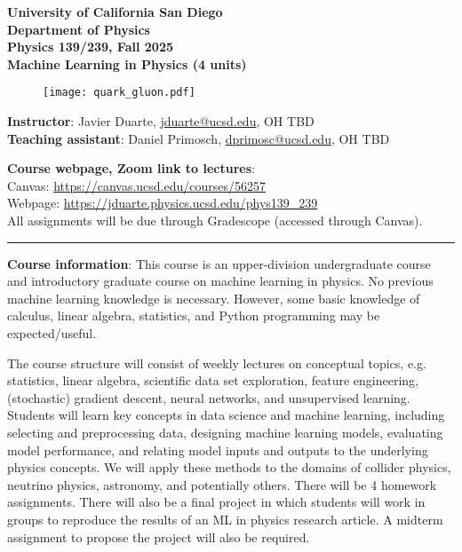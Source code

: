 \documentclass[12pt]{article}
\begin{document}
\begin{center}
	\textbf{University of California San Diego\\
		Department of Physics\\
		Physics 139/239, Fall 2025\\
		Machine Learning in Physics (4 units)}
\end{center}

\begin{figure}[h!]
	\centering
	\texttt{[image: quark\_gluon.pdf]}
\end{figure}

\noindent\textbf{Instructor}: Javier Duarte, \href{mailto:jduarte@ucsd.edu}{jduarte@ucsd.edu}, OH TBD\\
\noindent \textbf{Teaching assistant}: Daniel Primosch, \href{mailto:dprimosc@ucsd.edu}{dprimosc@ucsd.edu}, OH TBD

\noindent\textbf{Course webpage, Zoom link to lectures}:\\
\hspace*{1cm}Canvas: \href{https://canvas.ucsd.edu/courses/56257}{https://canvas.ucsd.edu/courses/56257}\\
\hspace*{1cm}Webpage: \href{https://jduarte.physics.ucsd.edu/phys139\_239}{https://jduarte.physics.ucsd.edu/phys139\_239}\\
\hspace*{1cm}All assignments will be due through Gradescope (accessed through Canvas).

\begin{center}
	\rule{\textwidth}{0.5pt}
\end{center}

\noindent\textbf{Course information}: This course is an upper-division undergraduate course and introductory graduate course on machine learning in physics.
No previous machine learning knowledge is necessary.
However, some basic knowledge of calculus, linear algebra, statistics, and Python programming may be expected/useful.

The course structure will consist of weekly lectures on conceptual topics, e.g. statistics, linear algebra, scientific data set exploration, feature engineering, (stochastic) gradient descent, neural networks, and unsupervised learning.
Students will learn key concepts in data science and machine learning, including selecting and preprocessing data, designing machine learning models, evaluating model performance, and relating model inputs and outputs to the underlying physics concepts.
We will apply these methods to the domains of collider physics, neutrino physics, astronomy, and potentially others.
There will be 4 homework assignments.
There will also be a final project in which students will work in groups to reproduce the results of an ML in physics research article.
A midterm assignment to propose the project will also be required.
\end{document}

